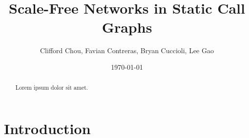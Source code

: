 \documentclass[11pt,a4paper,twocolumn]{article}
\author{Clifford Chou, Favian Contreras, Bryan Cuccioli, Lee Gao}
\title{Scale-Free Networks in Static Call Graphs}
\date{\today}
\begin{document}
\maketitle

\begin{abstract}
Lorem ipsum dolor sit amet.
\end{abstract}

\section{Introduction}

\printbibliography[title={References}]
\end{document}
